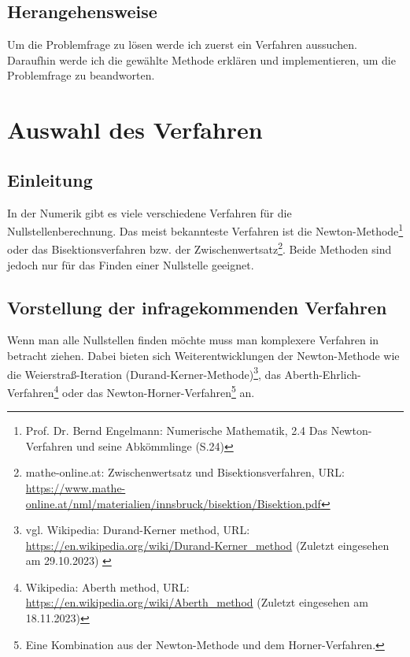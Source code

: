 \documentclass[12pt]{article}
\begin{document}
\subsection{Herangehensweise}
Um die Problemfrage zu lösen werde ich zuerst ein Verfahren aussuchen. Daraufhin werde ich die gewählte Methode erklären und implementieren, um die Problemfrage zu beandworten. %

\section{Auswahl des Verfahren}
\subsection{Einleitung}
In der Numerik gibt es viele verschiedene Verfahren für die Nullstellenberechnung. Das meist bekannteste Verfahren ist die Newton-Methode\footnote{
    Prof. Dr. Bernd Engelmann: Numerische Mathematik, 2.4 Das Newton-Verfahren und seine Abkömmlinge (S.24)
} oder das Bisektionsverfahren bzw. der Zwischenwertsatz\footnote{
    mathe-online.at: Zwischenwertsatz und Bisektionsverfahren, URL: \url{https://www.mathe-online.at/nml/materialien/innsbruck/bisektion/Bisektion.pdf}
}. Beide Methoden sind jedoch nur für das Finden einer Nullstelle geeignet.

\subsection{Vorstellung der infragekommenden Verfahren}
Wenn man alle Nullstellen finden möchte muss man komplexere Verfahren in betracht ziehen. Dabei bieten sich Weiterentwicklungen der Newton-Methode wie die Weierstraß-Iteration (Durand-Kerner-Methode)\footnote{
    vgl. Wikipedia: Durand-Kerner method, URL: \url{https://en.wikipedia.org/wiki/Durand-Kerner_method} (Zuletzt eingesehen am 29.10.2023)
    \label{ftn:Wikipedia-Durand-Kerner-Method}
}, das Aberth-Ehrlich-Verfahren\footnote{
    Wikipedia: Aberth method, URL: \url{https://en.wikipedia.org/wiki/Aberth_method} (Zuletzt eingesehen am 18.11.2023)
} oder das Newton-Horner-Verfahren\footnote{
    Eine Kombination aus der Newton-Methode und dem Horner-Verfahren.
} an.
\end{document}
